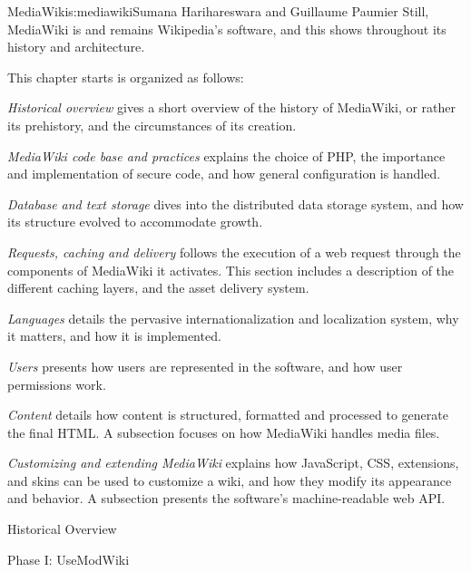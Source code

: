 \begin{aosachapter}{MediaWiki}{s:mediawiki}{Sumana Harihareswara and Guillaume Paumier}
Still, MediaWiki is and remains Wikipedia's software, and this shows
throughout its history and architecture.

This chapter starts is organized as follows:

\begin{aosaitemize}

\item \emph{Historical overview} gives a short overview of the history
  of MediaWiki, or rather its prehistory, and the circumstances of its
  creation.

\item \emph{MediaWiki code base and practices} explains the choice of
  PHP, the importance and implementation of secure code, and how
  general configuration is handled.

\item \emph{Database and text storage} dives into the distributed data
  storage system, and how its structure evolved to accommodate growth.

\item \emph{Requests, caching and delivery} follows the execution of a
  web request through the components of MediaWiki it activates. This
  section includes a description of the different caching layers, and
  the asset delivery system.

\item \emph{Languages} details the pervasive internationalization and
  localization system, why it matters, and how it is implemented.

\item \emph{Users} presents how users are represented in the software,
  and how user permissions work.

\item \emph{Content} details how content is structured, formatted and
  processed to generate the final HTML. A subsection focuses on how
  MediaWiki handles media files.

\item \emph{Customizing and extending MediaWiki} explains how
  JavaScript, CSS, extensions, and skins can be used to customize a
  wiki, and how they modify its appearance and behavior. A subsection
  presents the software's machine-readable web API.

\end{aosaitemize}

\begin{aosasect1}{Historical Overview}

\begin{aosasect2}{Phase I: UseModWiki}


\end{aosasect2}
\end{aosasect1}
\end{aosachapter}
